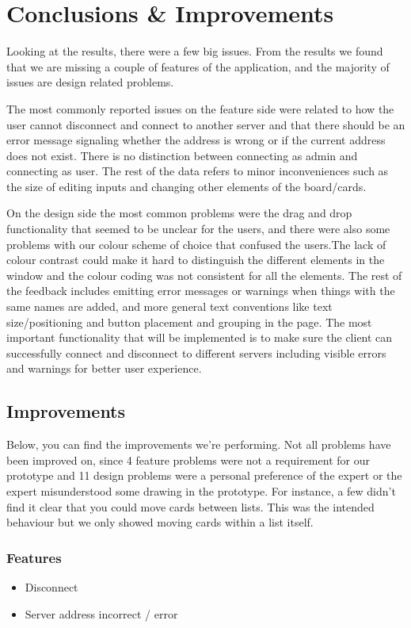 \section{Conclusions \& Improvements}
Looking at the results, there were a few big issues. 
From the results we found that we are missing a couple of features of the application, and the majority of issues are design related problems.

The most commonly reported issues on the feature side were related to how the user cannot disconnect and connect to another server and that there should be an error message signaling whether the address is wrong or if the current address does not exist. There is no distinction between connecting as admin and connecting as user. The rest of the data refers to minor inconveniences such as the size of editing inputs and changing other elements of the board/cards.

On the design side the most common problems were the drag and drop functionality that seemed to be unclear for the users, and there were also some problems with our colour scheme of choice that confused the users.The lack of colour contrast could make it hard to distinguish the different elements in the window and the colour coding was not consistent for all the elements.
The rest of the feedback includes emitting error messages or warnings when things with the same names are added, and more general text conventions like text size/positioning and button placement and grouping in the page. The most important functionality that will be implemented is to make sure the client can successfully connect and disconnect to different servers including visible errors and warnings for better user experience. 

\subsection{Improvements}
Below, you can find the improvements we're performing. Not all problems have been improved on, since 4 feature problems were not a requirement for our prototype and 11 design problems were a personal preference of the expert or the expert misunderstood some drawing in the prototype. For instance, a few didn't find it clear that you could move cards between lists. This was the intended behaviour but we only showed moving cards within a list itself.

\subsubsection{Features}
\begin{itemize}
    \item Disconnect
    \item Server address incorrect / error
\end{itemize}

